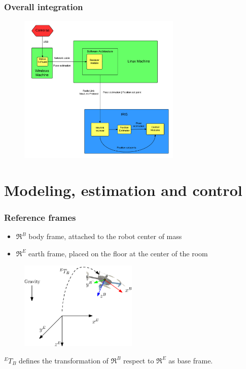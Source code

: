 \documentclass[xcolor=dvipsnames]{beamer}
\begin{document}
\begin{frame}
\frametitle{Overall integration}
\begin{figure}
\centering
\includegraphics[width = 0.69\textwidth]{f/integration.png}
\end{figure}

\end{frame}

\section{Modeling, estimation and control}

\begin{frame}
\tableofcontents[sectionstyle=show,square,currentsection]
\end{frame}

\begin{frame}[t]
\frametitle{Reference frames}
\begin{itemize}
\item $\Re^B$ body frame, attached to the robot center of mass
\item $\Re^E$ earth frame, placed on the floor at the center of the room
\end{itemize}
\begin{figure}
\centering
\includegraphics[width = 0.5\textwidth]{f/ref_frames.eps}
\end{figure}
${}^ET_B$ defines the transformation of $\Re^B$ respect to $\Re^E$ as base frame.
\end{frame}
\end{document}
